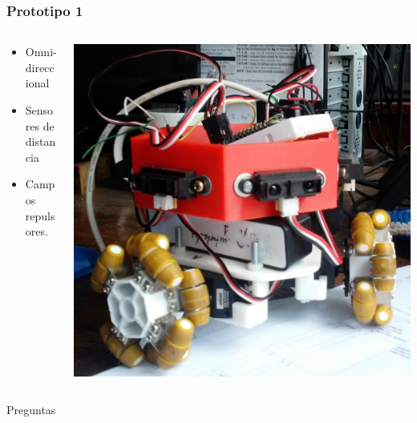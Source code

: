 \documentclass[spanish]{beamer}
\begin{document}
\begin{frame}
	\frametitle{Prototipo 1}
	
  \begin{columns}[T]
  	\begin{column}{.5\textwidth}
  		\vspace{1em}
		\begin{itemize}
			\item Omni-direccional
			\item Sensores de distancia
			\item Campos repulsores.
		\end{itemize}
  	\end{column}
  	\begin{column}{.5\textwidth}
		\begin{center}
			\includegraphics[width=\textwidth]{robotito.png}
		\end{center}
  	\end{column}
  \end{columns}
\end{frame}

\begin{frame}	
\Huge{\centerline{Preguntas}}
\end{frame}

\end{document}
